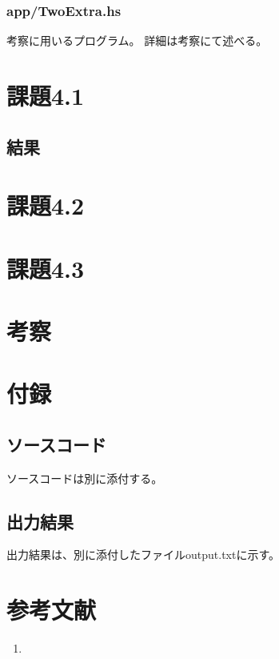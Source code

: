 \documentclass[11pt]{jsarticle}
\begin{document}
\subsubsection*{app/TwoExtra.hs}
考察に用いるプログラム。
詳細は考察にて述べる。


\section{課題4.1}
\subsection{結果}
\section{課題4.2}
\section{課題4.3}

\section{考察}

\section{付録}
\subsection{ソースコード}
ソースコードは別に添付する。

\subsection{出力結果}
出力結果は、別に添付したファイルoutput.txtに示す。

\section{参考文献}
\begin{enumerate}
\item
\end{enumerate}
\end{document}
